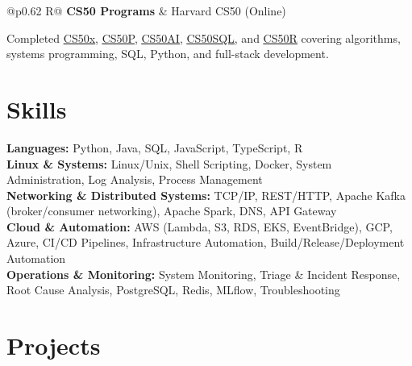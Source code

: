 \documentclass[a4paper,10pt]{article}
\newcommand{\ulink}[2]{\href{#1}{\uline{#2}}}
\newcommand{\subheading}[1]{{\color[HTML]{0A0A0A}\fontsize{12}{14}\selectfont\bfseries #1}}
\newcommand{\meta}[1]{{\color[HTML]{5C5C5C}\fontsize{10.5}{12.5}\selectfont #1}}
\begin{document}
\begin{tabularx}{\linewidth}{@{}p{0.62\linewidth} R@{}}
\subheading{CS50 Programs} & \meta{Harvard CS50 (Online)}
\end{tabularx}
\vspace{2pt}
{\color[HTML]{3A3A3A}\fontsize{11}{14}\selectfont Completed \ulink{https://cs50.harvard.edu/certificates/b14b78df-e05c-413e-a607-1dd27303053a}{CS50x}, \ulink{https://cs50.harvard.edu/certificates/32477052-9db4-49c4-a5a4-d7e58429ca2c}{CS50P}, \ulink{https://cs50.harvard.edu/certificates/9cdb4d4a-1250-4f8e-9fd7-191864e0f919}{CS50AI}, \ulink{https://cs50.harvard.edu/certificates/bc486f24-f085-4e61-8536-80940b97a1b9}{CS50SQL}, and \ulink{https://cs50.harvard.edu/certificates/666838e6-a053-4d82-b179-a60fe745fd84}{CS50R} covering algorithms, systems programming, SQL, Python, and full-stack development.}

\vspace{2pt}

\section{Skills}
\vspace{2pt}
{\color[HTML]{0A0A0A}\fontsize{11}{14}\selectfont
\textbf{Languages:} Python, Java, SQL, JavaScript, TypeScript, R \\[2pt]
\textbf{Linux \& Systems:} Linux/Unix, Shell Scripting, Docker, System Administration, Log Analysis, Process Management \\[2pt]
\textbf{Networking \& Distributed Systems:} TCP/IP, REST/HTTP, Apache Kafka (broker/consumer networking), Apache Spark, DNS, API Gateway \\[2pt]
\textbf{Cloud \& Automation:} AWS (Lambda, S3, RDS, EKS, EventBridge), GCP, Azure, CI/CD Pipelines, Infrastructure Automation, Build/Release/Deployment Automation \\[2pt]
\textbf{Operations \& Monitoring:} System Monitoring, Triage \& Incident Response, Root Cause Analysis, PostgreSQL, Redis, MLflow, Troubleshooting}

\vspace{2pt}

\section{Projects}
\vspace{2pt}
\end{document}
